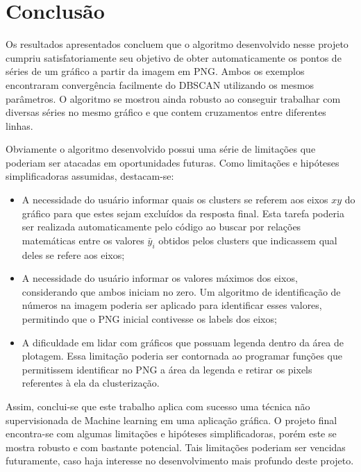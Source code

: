 \documentclass{article}
\begin{document}
    \section{Conclusão}
    
    Os resultados apresentados concluem que o algoritmo desenvolvido nesse projeto cumpriu satisfatoriamente seu objetivo de obter automaticamente os pontos de séries de um gráfico a partir da imagem em PNG. Ambos os exemplos encontraram convergência facilmente do DBSCAN utilizando os mesmos parâmetros. O algoritmo se mostrou ainda robusto ao conseguir trabalhar com diversas séries no mesmo gráfico e que contem cruzamentos entre diferentes linhas. 
    
    Obviamente o algoritmo desenvolvido possui uma série de limitações que poderiam ser atacadas em oportunidades futuras. Como limitações e hipóteses simplificadoras assumidas, destacam-se:
    
    \begin{itemize}
        \item A necessidade do usuário informar quais os clusters se referem aos eixos $xy$ do gráfico para que estes sejam excluídos da resposta final. Esta tarefa poderia ser realizada automaticamente pelo código ao buscar por relações matemáticas entre os valores $\bar{y}_i$ obtidos pelos clusters que indicassem qual deles se refere aos eixos;
        
        \item A necessidade do usuário informar os valores máximos dos eixos, considerando que ambos iniciam no zero. Um algoritmo de identificação de números na imagem poderia ser aplicado para identificar esses valores, permitindo que o PNG inicial contivesse os labels dos eixos;
        
        \item A dificuldade em lidar com gráficos que possuam legenda dentro da área de plotagem. Essa limitação poderia ser contornada ao programar funções que permitissem identificar no PNG a área da legenda e retirar os pixels referentes à ela da clusterização.
        
    \end{itemize}
    
    Assim, conclui-se que este trabalho aplica com sucesso uma técnica não supervisionada de Machine learning em uma aplicação gráfica. O projeto final encontra-se com algumas limitações e hipóteses simplificadoras, porém este se mostra robusto e com bastante potencial. Tais limitações poderiam ser vencidas futuramente, caso haja interesse no desenvolvimento mais profundo deste projeto.
    
    
\end{document}
